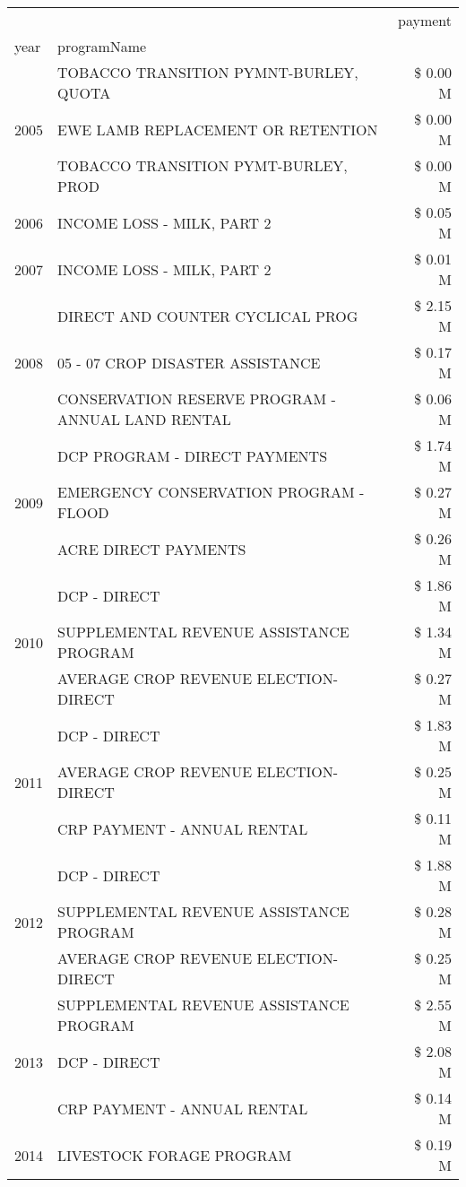 \begin{tabular}{llr}
\toprule
 &  & payment \\
year & programName &  \\
\midrule
\multirow[t]{3}{*}{2005} & TOBACCO TRANSITION PYMNT-BURLEY, QUOTA & \$ 0.00 M \\
 & EWE LAMB REPLACEMENT OR RETENTION & \$ 0.00 M \\
 & TOBACCO TRANSITION PYMT-BURLEY, PROD & \$ 0.00 M \\
\cline{1-3}
2006 & INCOME LOSS - MILK, PART 2 & \$ 0.05 M \\
\cline{1-3}
2007 & INCOME LOSS - MILK, PART 2 & \$ 0.01 M \\
\cline{1-3}
\multirow[t]{3}{*}{2008} & DIRECT AND COUNTER CYCLICAL PROG & \$ 2.15 M \\
 & 05 - 07 CROP DISASTER ASSISTANCE & \$ 0.17 M \\
 & CONSERVATION RESERVE PROGRAM - ANNUAL LAND RENTAL & \$ 0.06 M \\
\cline{1-3}
\multirow[t]{3}{*}{2009} & DCP PROGRAM - DIRECT PAYMENTS & \$ 1.74 M \\
 & EMERGENCY CONSERVATION PROGRAM - FLOOD & \$ 0.27 M \\
 & ACRE DIRECT PAYMENTS & \$ 0.26 M \\
\cline{1-3}
\multirow[t]{3}{*}{2010} & DCP - DIRECT & \$ 1.86 M \\
 & SUPPLEMENTAL REVENUE ASSISTANCE PROGRAM & \$ 1.34 M \\
 & AVERAGE CROP REVENUE ELECTION-DIRECT & \$ 0.27 M \\
\cline{1-3}
\multirow[t]{3}{*}{2011} & DCP - DIRECT & \$ 1.83 M \\
 & AVERAGE CROP REVENUE ELECTION-DIRECT & \$ 0.25 M \\
 & CRP PAYMENT - ANNUAL RENTAL & \$ 0.11 M \\
\cline{1-3}
\multirow[t]{3}{*}{2012} & DCP - DIRECT & \$ 1.88 M \\
 & SUPPLEMENTAL REVENUE ASSISTANCE PROGRAM & \$ 0.28 M \\
 & AVERAGE CROP REVENUE ELECTION-DIRECT & \$ 0.25 M \\
\cline{1-3}
\multirow[t]{3}{*}{2013} & SUPPLEMENTAL REVENUE ASSISTANCE PROGRAM & \$ 2.55 M \\
 & DCP - DIRECT & \$ 2.08 M \\
 & CRP PAYMENT - ANNUAL RENTAL & \$ 0.14 M \\
\cline{1-3}
\multirow[t]{3}{*}{2014} & LIVESTOCK FORAGE PROGRAM & \$ 0.19 M \\

\end{tabular}
